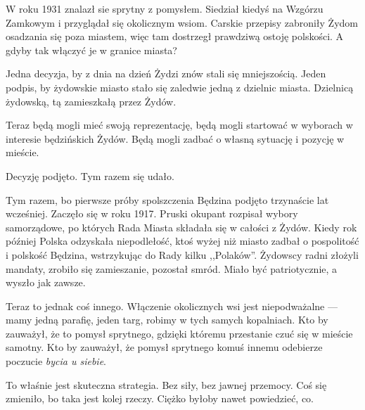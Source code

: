 \documentclass[11pt,a4paper,oneside]{article}
\begin{document}
W roku 1931 znalazł sie sprytny z pomysłem. Siedział kiedyś na Wzgórzu
Zamkowym i przyglądał się okolicznym wsiom. Carskie przepisy zabroniły
Żydom osadzania się poza miastem, więc tam dostrzegł prawdziwą ostoję
polskości. A gdyby tak włączyć je w granice miasta? 

Jedna decyzja, by z dnia na dzień Żydzi znów stali się mniejszością.
Jeden podpis, by żydowskie miasto stało się zaledwie jedną z dzielnic
miasta.  Dzielnicą żydowską, tą zamieszkałą przez Żydów. 

Teraz będą mogli mieć swoją reprezentację, będą mogli startować
w wyborach w interesie będzińskich Żydów. Będą mogli zadbać o własną
sytuację i pozycję w mieście. 

Decyzję podjęto. Tym razem się udało. 

Tym razem, bo pierwsze próby spolszczenia Będzina podjęto trzynaście 
lat wcześniej. Zaczęło się w roku 1917. Pruski okupant
rozpisał wybory samorządowe, po których Rada Miasta składała się
w całości z Żydów. Kiedy rok później Polska odzyskała niepodlełość,
ktoś wyżej niż miasto zadbał o pospolitość i polskość Będzina,
wstrzykując do Rady kilku ,,Polaków''. Żydowscy radni złożyli
mandaty, zrobiło się zamieszanie, pozostał smród. Miało być
patriotycznie, a wyszło jak zawsze.

Teraz to jednak coś innego. Włączenie okolicznych wsi jest
niepodważalne --- mamy jedną parafię, jeden targ, robimy w  tych
samych kopalniach. Kto by zauważył, że to pomysł sprytnego, gdzięki
któremu przestanie czuć się w mieście samotny. Kto by zauważył, 
że pomysł sprytnego komuś innemu odebierze poczucie \emph{bycia u siebie}.

To właśnie jest skuteczna strategia. Bez siły, bez jawnej 
przemocy. Coś się zmieniło, bo taka jest kolej rzeczy. 
Ciężko byłoby nawet powiedzieć, co. 
\end{document}
